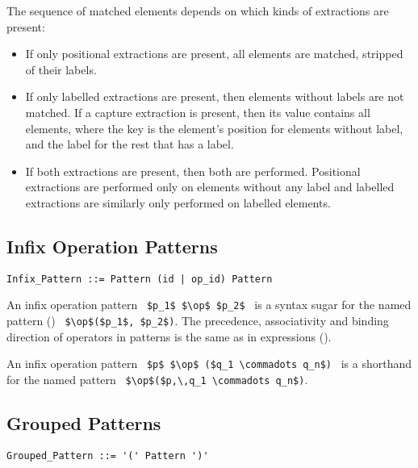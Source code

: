 The sequence of matched elements depends on which kinds of extractions are present:
\begin{itemize}
  \item If only positional extractions are present, all elements are matched, stripped of their labels. 
  \item If only labelled extractions are present, then elements without labels are not matched. If a capture extraction is present, then its value contains all elements, where the key is the element's position for elements without label, and the label for the rest that has a label. 
  \item If both extractions are present, then both are performed. Positional extractions are performed only on elements without any label and labelled extractions are similarly only performed on labelled elements. 
\end{itemize}





\subsection{Infix Operation Patterns}
\label{sec:infix-patterns}

\grammar\begin{lstlisting}
Infix_Pattern ::= Pattern (id | op_id) Pattern
\end{lstlisting}

An infix operation pattern ~\lstinline!$p_1$ $\op$ $p_2$!~ is a syntax sugar for the named pattern () ~\lstinline!$\op$($p_1$, $p_2$)!. The precedence, associativity and binding direction of operators in patterns is the same as in expressions ().

An infix operation pattern ~\lstinline!$p$ $\op$ ($q_1 \commadots q_n$)!~ is a shorthand for the named pattern ~\lstinline!$\op$($p,\,q_1 \commadots q_n$)!.





\subsection{Grouped Patterns}
\label{sec:grouped-patterns}

\grammar\begin{lstlisting}
Grouped_Pattern ::= '(' Pattern ')'
\end{lstlisting}

